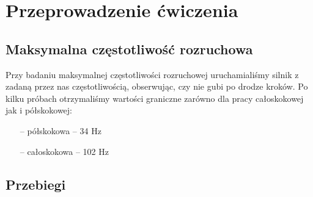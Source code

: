 \documentclass[a4paper, 12pt]{article}
\begin{document}
	\section{Przeprowadzenie ćwiczenia}
		\subsection{Maksymalna częstotliwość rozruchowa}
			Przy badaniu maksymalnej częstotliwości rozruchowej uruchamialiśmy silnik z zadaną przez nas częstotliwością, obserwując, czy nie gubi po drodze kroków. Po kilku próbach otrzymaliśmy wartości graniczne zarówno dla pracy całoskokowej jak i półskokowej:
			\begin{itemize}
				\item[--] półskokowa -- 34 Hz
				\item[--] całoskokowa -- 102 Hz
			\end{itemize}
		\subsection{Przebiegi}
\end{document}
